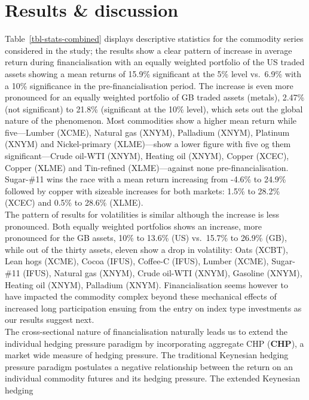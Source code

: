 \documentclass[
  authoryear,
  preprint,
  3p]{elsarticle}
\begin{document}
\newpage

\section{Results \& discussion}\label{sec-results}

Table~\ref{tbl-stats-combined} displays descriptive statistics for the
commodity series considered in the study; the results show a clear
pattern of increase in average return during financialisation with an
equally weighted portfolio of the US traded assets showing a mean
returns of 15.9\% significant at the 5\% level vs.~6.9\% with a 10\%
significance in the pre-financialisation period. The increase is even
more pronounced for an equally weighted portfolio of GB traded assets
(metals), 2.47\% (not significant) to 21.8\% (significant at the 10\%
level), which sets out the global nature of the phenomenon. Most
commodities show a higher mean return while five---Lumber (XCME),
Natural gas (XNYM), Palladium (XNYM), Platinum (XNYM) and Nickel-primary
(XLME)---show a lower figure with five og them significant---Crude
oil-WTI (XNYM), Heating oil (XNYM), Copper (XCEC), Copper (XLME) and
Tin-refined (XLME)---against none pre-financialisation. Sugar-\#11 wins
the race with a mean return increasing from -4.6\% to 24.9\% followed by
copper with sizeable increases for both markets: 1.5\% to 28.2\% (XCEC)
and 0.5\% to 28.6\% (XLME).\\
The pattern of results for volatilities is similar although the increase
is less pronounced. Both equally weighted portfolios shows an increase,
more pronounced for the GB assets, 10\% to 13.6\% (US) vs.~15.7\% to
26.9\% (GB), while out of the thirty assets, eleven show a drop in
volatility: Oats (XCBT), Lean hogs (XCME), Cocoa (IFUS), Coffee-C
(IFUS), Lumber (XCME), Sugar-\#11 (IFUS), Natural gas (XNYM), Crude
oil-WTI (XNYM), Gasoline (XNYM), Heating oil (XNYM), Palladium (XNYM).
Financialisation seems however to have impacted the commodity complex
beyond these mechanical effects of increased long participation ensuing
from the entry on index type investments as our results suggest next.\\
The cross-sectional nature of financialisation naturally leads us to
extend the individual hedging pressure paradigm by incorporating
aggregate CHP (\textbf{CHP}), a market wide measure of hedging pressure.
The traditional Keynesian hedging pressure paradigm postulates a
negative relationship between the return on an individual commodity
futures and its hedging pressure. The extended Keynesian hedging
\end{document}
